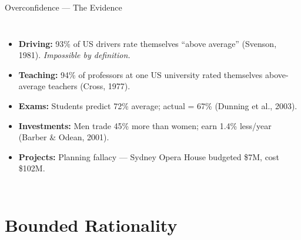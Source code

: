 \documentclass[aspectratio=169]{beamer}
\begin{document}
\begin{frame}{Overconfidence --- The Evidence}
\begin{columns}
\begin{itemize}[<+->]
  \item \textbf{Driving:} 93\% of US drivers rate themselves ``above average'' (Svenson, 1981). \textit{Impossible by definition.}
  \item \textbf{Teaching:} 94\% of professors at one US university rated themselves above-average teachers (Cross, 1977).
  \item \textbf{Exams:} Students predict 72\% average; actual = 67\% (Dunning et al., 2003).
  \item \textbf{Investments:} Men trade 45\% more than women; earn 1.4\% less/year (Barber \& Odean, 2001).
  \item \textbf{Projects:} Planning fallacy --- Sydney Opera House budgeted \$7M, cost \$102M.
\end{itemize}
\end{columns}
\end{frame}

\section{Bounded Rationality}
\end{document}
